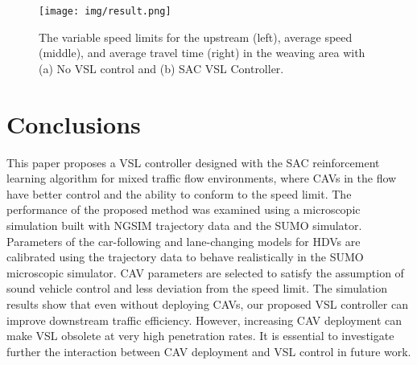 \documentclass[11pt, letterpaper]{article}
\begin{document}
\begin{figure}[!ht]
    \centering
    \texttt{[image: img/result.png]}
    \caption{The variable speed limits for the upstream (left), average speed (middle), and average travel time (right) in the weaving area with (a) No VSL control and (b) SAC VSL Controller.}
    \label{fig:5}
\end{figure}

\section{Conclusions}

This paper proposes a VSL controller designed with the SAC reinforcement learning algorithm for mixed traffic flow environments,  where CAVs in the flow have better control and the ability to conform to the speed limit. The performance of the proposed method was examined using a microscopic simulation built with NGSIM trajectory data and the SUMO simulator. Parameters of the car-following and lane-changing models for HDVs are calibrated using the trajectory data to behave realistically in the SUMO microscopic simulator. CAV parameters are selected to satisfy the assumption of sound vehicle control and less deviation from the speed limit. The simulation results show that even without deploying CAVs, our proposed VSL controller can improve downstream traffic efficiency. However, increasing CAV deployment can make VSL obsolete at very high penetration rates. It is essential to investigate further the interaction between CAV deployment and VSL control in future work.








\end{document}
